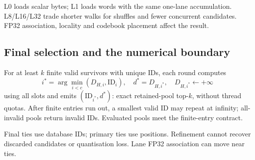 L0 loads scalar bytes; L1 loads words with the same one-lane accumulation. L8/L16/L32 trade shorter walks for shuffles and fewer concurrent candidates. FP32 association, locality and codebook placement affect the result.

\subsection{Final selection and the numerical boundary}

For at least $k$ finite valid survivors with unique IDs, each round computes
\[
 i^*=\arg\min_{i<c}(D_{H,i},\mathrm{ID}_i),\quad d^*=D_{H,i^*},\quad
 D_{H,i^*}\leftarrow+\infty
\]
using all slots and emits $(\mathrm{ID}_{i^*},d^*)$: exact retained-pool top-$k$, without thread quotas. After finite entries run out, a smallest valid ID may repeat at infinity; all-invalid pools return invalid IDs. Evaluated pools meet the finite-entry contract.

Final ties use database IDs; primary ties use positions. Refinement cannot recover discarded candidates or quantisation loss. Lane FP32 association can move near ties.

